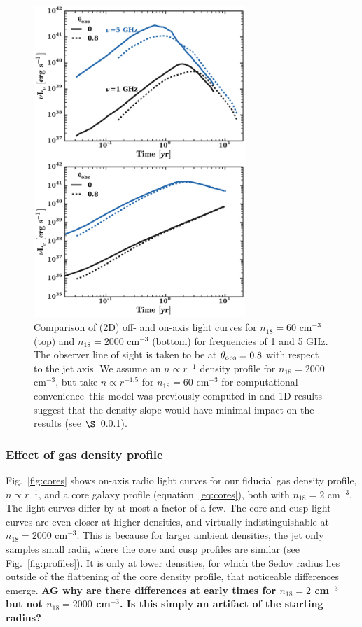 \documentclass[usenatbib,fleqn]{mnras}
\begin{document}
\begin{figure}
\includegraphics[width=8cm]{on_off.pdf}
\caption{\label{fig:onOff} Comparison of (2D) off- and on-axis light
  curves for $n_{18}=60$ cm$^{-3}$ (top) and $n_{18}=2000$ cm$^{-3}$
  (bottom) for frequencies of 1 and 5 GHz. The observer line of sight
  is taken to be at $\theta_{\rm obs}=0.8$ with respect to the jet
  axis. We assume an $n\propto r^{-1}$ density profile for
  $n_{18}=2000$ cm$^{-3}$, but take $n\propto r^{-1.5}$ for
  $n_{18}=60$ cm$^{-3}$ for computational convenience--this model was
  previously computed in \citet{Mimica+2015} and 1D results suggest
  that the density slope would have minimal impact on the results (see
  $\S$~\ref{sec:profileComp}).}
\end{figure}

\subsubsection{Effect of gas density profile}
\label{sec:profileComp}
Fig.~\ref{fig:cores} shows on-axis radio light curves for our fiducial
gas density profile, $n\propto r^{-1}$, and a core galaxy profile (equation~\ref{eq:cores}),
both with $n_{18}=2$ cm$^{-3}$.  The light curves differ by at most a
factor of a few. The core and cusp light curves are even closer at
higher densities, and virtually indistinguishable at $n_{18}=2000$
cm$^{-3}$. This is because for larger ambient densities, the jet only
samples small radii, where the core and cusp profiles are 
similar (see Fig.~\ref{fig:profiles}). It is only at lower densities,
for which the Sedov radius lies outside of the flattening of the core
density profile, that noticeable differences emerge. {\bf AG why are
  there differences at early times for $n_{18}=2$ cm$^{-3}$ but not
  $n_{18}=2000$ cm$^{-3}$. Is this simply an artifact of the starting
  radius?}
\end{document}
